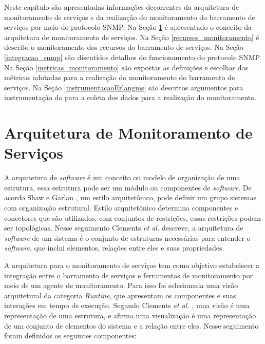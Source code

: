 \label{monitoramento_servicos}

Neste capítulo são apresentadas informações decorrentes da arquitetura de monitoramento de serviços e da realização do monitoramento do barramento de serviços por meio do protocolo \acrshort{SNMP}. Na Seção \ref{arquitetura_monitoramento} é apresentado o conceito da arquitetura de monitoramento de serviços. Na Seção \ref{recursos_monitoramento} é descrito o monitoramento dos recursos do barramento de serviços. Na Seção \ref{integracao_snmp} são discutidos detalhes do funcionamento do protocolo \acrshort{SNMP}. Na Seção \ref{metricas_monitoramento} são expostas as definições e escolhas das métricas adotadas para a realização do monitoramento do barramento de serviços. Na Seção \ref{instrumentacaoErlangms} são descritos argumentos para instrumentação do para a coleta dos dados para a realização do monitoramento.

\section{Arquitetura de Monitoramento de Serviços}%
\label{arquitetura_monitoramento}

A arquitetura de \textit{software} é um conceito ou modelo de organização de uma estrutura, essa estrutura pode ser um módulo ou componentes de \textit{software}. De acordo Shaw e Garlan \cite{garlan1993introduction}, um estilo arquitetônico, pode definir um grupo sistemas com organização estrutural. Estilo arquitetônico determina componentes e conectores que são utilizados, com conjuntos de restrições, essas restrições podem ser topológicas. Nesse seguimento Clements \textit{et al.} \cite{clements2002documenting} descreve, a arquitetura de \textit{software} de um sistema é o conjunto de estruturas necessárias para entender o \textit{software}, que inclui elementos, relações entre eles e suas propriedades.

A arquitetura para o monitoramento de serviços tem como objetivo estabelecer a integração entre o barramento de serviços e ferramentas de monitoramento por meio de um agente de monitoramento. Para isso foi selecionada uma visão arquitetural da categoria \textit{Runtine}, que apresentam os componentes e suas interações em tempo de execução. Segundo Clements \textit{et al.} \cite{clements2002documenting}, uma visão é uma representação de uma estrutura, e afirma uma visualização é uma representação de um conjunto de elementos do sistema e a relação entre eles. Nesse seguimento foram definidos os seguintes componentes:

